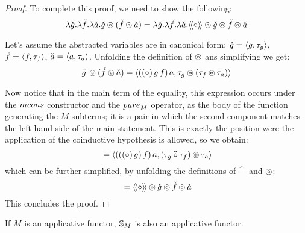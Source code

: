 \begin{proof}
To complete this proof, we need to show the following:
$$
\lambda \check{g}. \lambda \check{f}. \lambda \check{a}. \check{g} \circledcirc (\check{f}\circledcirc \check{a})
  = 
\lambda \check{g}. \lambda \check{f}. \lambda \check{a}. \mathopen{\langle\!\langle}{\circ}\mathclose{\rangle\!\rangle} \circledcirc \check{g}  \circledcirc \check{f}  \circledcirc \check{a}
$$

Let's assume the abstracted variables are in canonical form: $\check{g} = \langle g, \tau_g \rangle$, $\check{f} = \langle f, \tau_f \rangle$, $\check{a} = \langle a, \tau_a \rangle$.
Unfolding the definition of $\circledcirc$ ans simplifying we get:
$$
\check{g}\, \circledcirc (\check{f} \circledcirc \check{a})
 = \langle ((\circ)\, g\, f)\, a, \tau_g \circledast (\tau_f \circledast \tau_a) \rangle
$$

Now notice that in the main term of the equality, this expression occurs under the $\mcons$ constructor and the $\apure_M$ operator, as the body of the function generating the $M$-subterms; it is a pair in which the second component matches the left-hand side of the main statement.
This is exactly the position were the application of the coinductive hypothesis is allowed, so we obtain:
$$
{} = \langle (((\circ)\, g)\, f)\, a, (\tau_g \mathbin{\widehat{\circ}} \tau_f) \circledast \tau_a \rangle
$$
which can be further simplified, by unfolding the definitions of $\mathbin{\widehat{-}}$ and $\circledcirc$:
$$
{} = \mathopen{\langle\!\langle}{\circ}\mathclose{\rangle\!\rangle} \circledcirc \check{g} \circledcirc \check{f} \circledcirc \check{a}
$$
This concludes the proof.
\end{proof}


\begin{theorem}\label{lemma:appl_laws}
If $M$ is an applicative functor, $\mathbb{S}_{M}$ is also an applicative functor.
\end{theorem}
